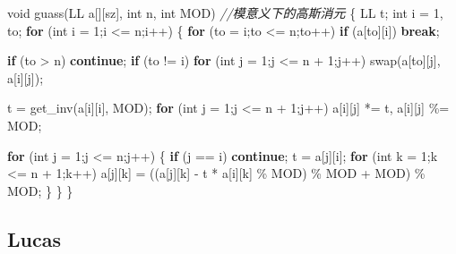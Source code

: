 \documentclass[
]{article}
\newenvironment{Shaded}{}{}
\newcommand{\CommentTok}[1]{\textcolor[rgb]{0.38,0.63,0.69}{\textit{#1}}}
\newcommand{\ControlFlowTok}[1]{\textcolor[rgb]{0.00,0.44,0.13}{\textbf{#1}}}
\newcommand{\DataTypeTok}[1]{\textcolor[rgb]{0.56,0.13,0.00}{#1}}
\newcommand{\DecValTok}[1]{\textcolor[rgb]{0.25,0.63,0.44}{#1}}
\newcommand{\NormalTok}[1]{#1}
\begin{document}
\begin{Shaded}
\begin{Highlighting}[]
\DataTypeTok{void}\NormalTok{ guass(LL a[][sz], }\DataTypeTok{int}\NormalTok{ n, }\DataTypeTok{int}\NormalTok{ MOD) }\CommentTok{//模意义下的高斯消元}
\NormalTok{\{}
\NormalTok{    LL t;}
    \DataTypeTok{int}\NormalTok{ i = }\DecValTok{1}\NormalTok{, to;}
    \ControlFlowTok{for}\NormalTok{ (}\DataTypeTok{int}\NormalTok{ i = }\DecValTok{1}\NormalTok{;i \textless{}= n;i++)}
\NormalTok{    \{}
        \ControlFlowTok{for}\NormalTok{ (to = i;to \textless{}= n;to++)}
            \ControlFlowTok{if}\NormalTok{ (a[to][i]) }\ControlFlowTok{break}\NormalTok{;}

        \ControlFlowTok{if}\NormalTok{ (to \textgreater{} n) }\ControlFlowTok{continue}\NormalTok{;}
        \ControlFlowTok{if}\NormalTok{ (to != i)}
            \ControlFlowTok{for}\NormalTok{ (}\DataTypeTok{int}\NormalTok{ j = }\DecValTok{1}\NormalTok{;j \textless{}= n + }\DecValTok{1}\NormalTok{;j++)}
\NormalTok{                swap(a[to][j], a[i][j]);}
        
\NormalTok{        t = get\_inv(a[i][i], MOD);}
        \ControlFlowTok{for}\NormalTok{ (}\DataTypeTok{int}\NormalTok{ j = }\DecValTok{1}\NormalTok{;j \textless{}= n + }\DecValTok{1}\NormalTok{;j++)}
\NormalTok{            a[i][j] *= t, a[i][j] \%= MOD;}

        \ControlFlowTok{for}\NormalTok{ (}\DataTypeTok{int}\NormalTok{ j = }\DecValTok{1}\NormalTok{;j \textless{}= n;j++)}
\NormalTok{        \{}
            \ControlFlowTok{if}\NormalTok{ (j == i) }\ControlFlowTok{continue}\NormalTok{;}
\NormalTok{            t = a[j][i];}
            \ControlFlowTok{for}\NormalTok{ (}\DataTypeTok{int}\NormalTok{ k = }\DecValTok{1}\NormalTok{;k \textless{}= n + }\DecValTok{1}\NormalTok{;k++)}
\NormalTok{                a[j][k] = ((a[j][k] {-} t * a[i][k] \% MOD) }
\NormalTok{                    \% MOD + MOD) \% MOD;}
\NormalTok{        \}}
\NormalTok{    \}}
\NormalTok{\}}
\end{Highlighting}
\end{Shaded}

\hypertarget{lucas}{%
\subsection{Lucas}\label{lucas}}
\end{document}
